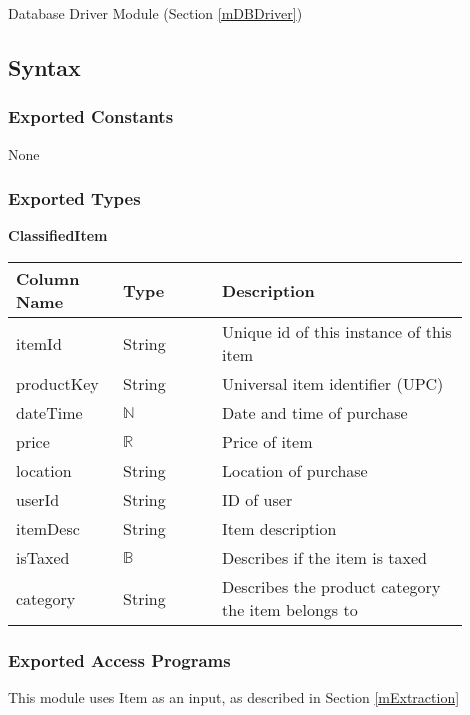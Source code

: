 \documentclass[12pt, titlepage]{article}
\begin{document}
Database Driver Module (Section \ref{mDBDriver})

\subsection{Syntax}

\subsubsection{Exported Constants}

None

\subsubsection{Exported Types}

\textbf{ClassifiedItem}

\begin{table}[H]
  \begin{tabular}{|p{0.2\linewidth}|p{0.2\linewidth}|p{0.5\linewidth}|}
    \hline
    \textbf{Column Name} & \textbf{Type} & \textbf{Description} \\
    \hline
    itemId & String & Unique id of this instance of this item \\
    \hline
    productKey & String & Universal item identifier (UPC) \\
    \hline
    dateTime & $\mathbb{N}$ & Date and time of purchase \\
    \hline
    price & $\mathbb{R}$ & Price of item \\
    \hline
    location & String & Location of purchase \\
    \hline
    userId & String & ID of user\\
    \hline
    itemDesc & String & Item description\\
    \hline
    isTaxed & $\mathbb{B}$ & Describes if the item is taxed\\
    \hline
    category & String & Describes the product category the item belongs to\\
    \hline
  \end{tabular}
\end{table}

\subsubsection{Exported Access Programs}

This module uses Item as an input, as described in Section \ref{mExtraction}
\end{document}
